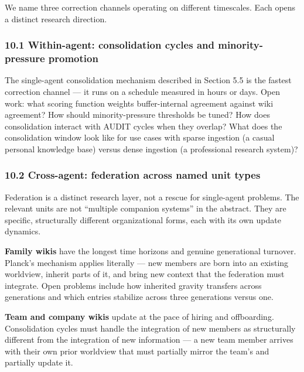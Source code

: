 \documentclass[
  11pt,
]{article}
\begin{document}
We name three correction channels operating on different timescales.
Each opens a distinct research direction.

\hypertarget{within-agent-consolidation-cycles-and-minority-pressure-promotion}{%
\subsubsection{10.1 Within-agent: consolidation cycles and
minority-pressure
promotion}\label{within-agent-consolidation-cycles-and-minority-pressure-promotion}}

The single-agent consolidation mechanism described in Section 5.5 is the
fastest correction channel --- it runs on a schedule measured in hours
or days. Open work: what scoring function weights buffer-internal
agreement against wiki agreement? How should minority-pressure
thresholds be tuned? How does consolidation interact with AUDIT cycles
when they overlap? What does the consolidation window look like for use
cases with sparse ingestion (a casual personal knowledge base) versus
dense ingestion (a professional research system)?

\hypertarget{cross-agent-federation-across-named-unit-types}{%
\subsubsection{10.2 Cross-agent: federation across named unit
types}\label{cross-agent-federation-across-named-unit-types}}

Federation is a distinct research layer, not a rescue for single-agent
problems. The relevant units are not ``multiple companion systems'' in
the abstract. They are specific, structurally different organizational
forms, each with its own update dynamics.

\textbf{Family wikis} have the longest time horizons and genuine
generational turnover. Planck's mechanism applies literally --- new
members are born into an existing worldview, inherit parts of it, and
bring new context that the federation must integrate. Open problems
include how inherited gravity transfers across generations and which
entries stabilize across three generations versus one.

\textbf{Team and company wikis} update at the pace of hiring and
offboarding. Consolidation cycles must handle the integration of new
members as structurally different from the integration of new
information --- a new team member arrives with their own prior worldview
that must partially mirror the team's and partially update it.
\end{document}
